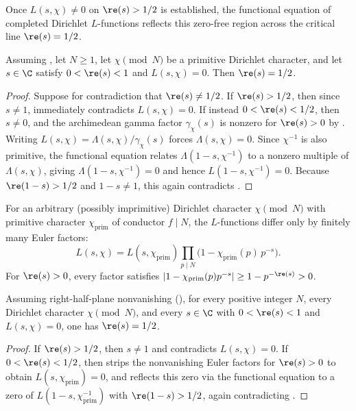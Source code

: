 Once $L(s, \chi) \neq 0$ on $\re(s) > 1/2$ is established, the functional
equation of completed Dirichlet $L$-functions reflects this zero-free region
across the critical line $\re(s) = 1/2$.

\begin{theorem}
\label{thm:grh-primitive}
Assuming , let $N \ge 1$, let
$\chi \pmod N$ be a primitive Dirichlet character, and let $s \in \C$ satisfy
$0 < \re(s) < 1$ and $L(s, \chi) = 0$. Then $\re(s) = 1/2$.
\end{theorem}

\begin{proof}
Suppose for contradiction that $\re(s) \neq 1/2$. If $\re(s) > 1/2$, then since
$s \neq 1$,  immediately contradicts
$L(s, \chi) = 0$. If instead $0 < \re(s) < 1/2$, then $s \neq 0$, and the
archimedean gamma factor $\gamma_\chi(s)$ is nonzero for $\re(s) > 0$ by
. Writing
$L(s, \chi) = \Lambda(s, \chi)/\gamma_\chi(s)$ forces $\Lambda(s, \chi) = 0$.
Since $\chi^{-1}$ is also primitive, the functional equation relates
$\Lambda(1 - s, \chi^{-1})$ to a nonzero multiple of $\Lambda(s, \chi)$, giving
$\Lambda(1 - s, \chi^{-1}) = 0$ and hence $L(1 - s, \chi^{-1}) = 0$. Because
$\re(1 - s) > 1/2$ and $1 - s \neq 1$, this again contradicts
.
\end{proof}

For an arbitrary (possibly imprimitive) Dirichlet character $\chi \pmod N$ with
primitive character $\chi_{\mathrm{prim}}$ of conductor $f \mid N$, the
$L$-functions differ only by finitely many Euler factors:
\[
  L(s, \chi) = L(s, \chi_{\mathrm{prim}}) \prod_{p \mid N} \bigl(1 - \chi_{\mathrm{prim}}(p)\, p^{-s}\bigr).
\]
For $\re(s) > 0$, every factor satisfies $|1 - \chi_{\mathrm{prim}}(p) p^{-s}| \ge 1 - p^{-\re(s)} > 0$.

\begin{corollary}
\label{cor:grh-all}
Assuming right-half-plane nonvanishing (), for every
positive integer $N$, every Dirichlet character $\chi \pmod N$, and every
$s \in \C$ with $0 < \re(s) < 1$ and $L(s, \chi) = 0$, one has $\re(s) = 1/2$.
\end{corollary}

\begin{proof}
If $\re(s) > 1/2$, then $s \neq 1$ and  contradicts
$L(s, \chi) = 0$. If $0 < \re(s) < 1/2$, then  strips
the nonvanishing Euler factors for $\re(s) > 0$ to obtain
$L(s, \chi_{\mathrm{prim}}) = 0$, and  reflects
this zero via the functional equation to a zero of
$L(1 - s, \chi_{\mathrm{prim}}^{-1})$ with $\re(1 - s) > 1/2$, again
contradicting .
\end{proof}

